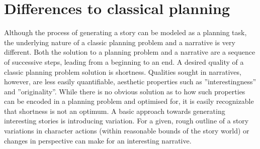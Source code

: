 \section{Differences to classical planning}\label{differences}
Although the process of generating a story can be modeled as a planning task, the underlying nature of a classic planning problem and a narrative is very different. Both the solution to a planning problem and a narrative are a sequence of successive steps, leading from a beginning to an end. A desired quality of a classic planning problem solution is shortness. Qualities sought in narratives, however, are less easily quantifiable, aesthetic properties such as ''interestingness'' and ''originality''. While there is no obvious solution as to how such properties can be encoded in a planning problem and optimised for, it is easily recognizable that shortness is not an optimum. A basic approach towards generating interesting stories is introducing variation. For a given, rough outline of a story variations in character actions (within reasonable bounds of the story world) or changes in perspective can make for an interesting narrative.


